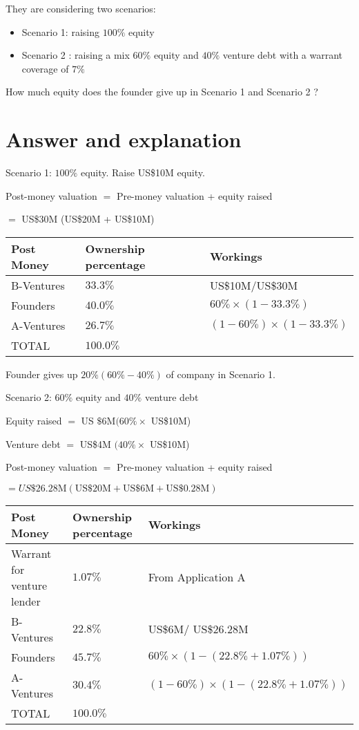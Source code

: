 \documentclass[11pt]{article}
\begin{document}
They are considering two scenarios:

\begin{itemize}
  \item Scenario 1: raising $100 \%$ equity
  \item Scenario 2 : raising a mix $60 \%$ equity and $40 \%$ venture debt with a warrant coverage of $7 \%$
\end{itemize}

How much equity does the founder give up in Scenario 1 and Scenario 2 ?

\section*{Answer and explanation}
Scenario 1: $100 \%$ equity. Raise US\$10M equity.

Post-money valuation $=$ Pre-money valuation + equity raised

$=$ US\$30M (US\$20M + US\$10M)

\begin{center}
\begin{tabular}{|l|l|l|}
\hline
Post Money & Ownership percentage & Workings \\
\hline
B-Ventures & $33.3 \%$ & US\$10M/US\$30M \\
\hline
Founders & $40.0 \%$ & $60 \% \times(1-33.3 \%)$ \\
\hline
A-Ventures & $26.7 \%$ & $(1-60 \%) \times(1-33.3 \%)$ \\
\hline
TOTAL & $100.0 \%$ &  \\
\hline
\end{tabular}
\end{center}

Founder gives up $20 \%(60 \%-40 \%)$ of company in Scenario 1.

Scenario 2: $60 \%$ equity and $40 \%$ venture debt

Equity raised $=$ US $\$ 6 \mathrm{M}(60 \% \times$ US\$10M)

Venture debt $=$ US\$4M $(40 \% \times$ US\$10M)

Post-money valuation $=$ Pre-money valuation + equity raised

$=U S \$ 26.28 \mathrm{M}(\mathrm{US} \$ 20 \mathrm{M}+\mathrm{US} \$ 6 \mathrm{M}+\mathrm{US} \$ 0.28 \mathrm{M})$

\begin{center}
\begin{tabular}{|l|l|l|}
\hline
Post Money & Ownership percentage & Workings \\
\hline
Warrant for venture lender & $1.07 \%$ & From Application A \\
\hline
B-Ventures & $22.8 \%$ & US\$6M/ US\$26.28M \\
\hline
Founders & $45.7 \%$ & $60 \% \times(1-(22.8 \%+1.07 \%))$ \\
\hline
A-Ventures & $30.4 \%$ & $(1-60 \%) \times(1-(22.8 \%+1.07 \%))$ \\
\hline
TOTAL & $100.0 \%$ &  \\
\hline
\end{tabular}
\end{center}
\end{document}
